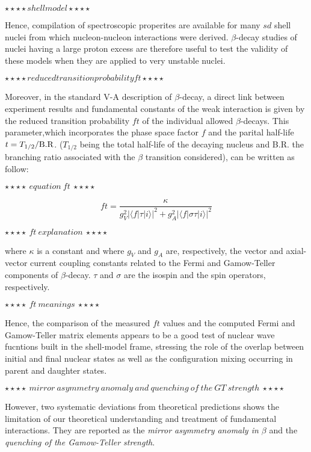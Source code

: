 \documentclass[UTF8]{ctexart}
\begin{document}
$\star\star\star\star shell model  \star\star\star\star$

Hence, compilation of spectroscopic properites are available for many $sd$ shell nuclei from which nucleon-nucleon interactions were derived. $\beta$-decay studies of nuclei having a large proton excess are therefore useful to test the validity of these models when they are applied to very unstable nuclei.

$\star\star\star\star reduced transition probability ft \star\star\star\star$

Moreover, in the standard V-A description of $\beta$-decay, a direct link between experiment results and fundamental constants of the weak interaction is given by the reduced transition probability $ft$ of the individual allowed $\beta$-decays. This parameter,which incorporates the phase space factor $f$ and the parital half-life $t=T_{1/2}/\rm{B.R}$. ($T_{1/2}$ being the total half-life of the decaying nucleus and B.R. the branching ratio associated with the $\beta$ transition considered), can be written as follow:

$\star\star\star\star~equation~ft~\star\star\star\star$

\begin{equation}
    ft=\frac{\kappa}{g^{2}_{V}\Big|\langle f|\tau|i \rangle\Big|^{2}+g^{2}_{A}\Big|\langle f|\sigma\tau|i \rangle\Big|^{2}}
\end{equation}

$\star\star\star\star~ft~explanation~\star\star\star\star$

where $\kappa$ is a constant and where $g_{V}$ and $g_{A}$ are, respectively, the vector and axial-vector current coupling constants related to the Fermi and Gamow-Teller components of $\beta$-decay. $\tau$ and $\sigma$ are the isospin and the spin operators, respectively. 

$\star\star\star\star~ft~meanings~\star\star\star\star$

Hence, the comparison of the measured $ft$ values and the computed Fermi and Gamow-Teller matrix elements appears to be a good test of nuclear wave fucntions built in the shell-model frame, stressing the role of the overlap between initial and final nuclear states as well as the configuration mixing occurring in parent and daughter states. 

$\star\star\star\star~mirror~asymmetry~anomaly~and~quenching~of~the~GT~strength~\star\star\star\star$

However, two systematic deviations from theoretical predictions shows the limitation of our theoretical understanding and treatment of fundamental interactions. They are reported as the \textit{mirror asymmetry anomaly in $\beta$} and the \textit{quenching of the Gamow-Teller strength}.
\end{document}
